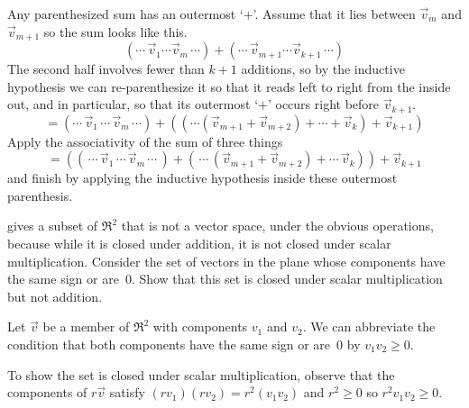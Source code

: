 \begin{exercises}
\begin{answer}
\begin{exparts}
          Any parenthesized sum has an outermost `\( + \)'.
          Assume that it lies between \( \vec{v}_m \) and \( \vec{v}_{m+1} \)
          so the sum looks like this.
          \begin{equation*}
            (\cdots\,\vec{v}_1\cdots\vec{v}_m\,\cdots)
           +(\cdots\,\vec{v}_{m+1}\cdots\vec{v}_{k+1}\,\cdots)
          \end{equation*}
          The second half involves fewer than $k+1$ additions, so
          by the inductive hypothesis we can re-parenthesize it
          so that it reads left to right from the inside out, and in 
          particular, so that its outermost `$+$' occurs right before 
          $\vec{v}_{k+1}$.
          \begin{equation*}
            =(\cdots\,\vec{v}_1\,\cdots\,\vec{v}_m\,\cdots)
             +((\cdots(\vec{v}_{m+1}+\vec{v}_{m+2})+\cdots+\vec{v}_{k})
                 +\vec{v}_{k+1})
          \end{equation*}
          Apply the associativity of the sum of three things
          \begin{equation*}
            =((\,\cdots\, \vec{v}_1\,\cdots\,\vec{v}_m\,\cdots\,)
             +(\,\cdots\,(\vec{v}_{m+1}+\vec{v}_{m+2})+\cdots\,\vec{v}_k))
             +\vec{v}_{k+1}
          \end{equation*}
          and finish by applying the inductive hypothesis inside these 
          outermost parenthesis.
      \end{exparts}  
    \end{answer}
  \item {} gives a subset of $\Re^2$
   that is not a vector space, under the obvious operations, because
   while it is closed under addition, it is not closed under scalar
   multiplication.
   Consider the set of vectors in the plane whose components have the 
   same sign or are~$0$.
   Show that this set is closed under scalar multiplication but not 
   addition.
   \begin{answer}
     Let $\vec{v}$ be a member of $\Re^2$ with components $v_1$ and $v_2$.
     We can abbreviate the condition that both components have the same
     sign or are~$0$ by $v_1v_2\geq 0$.

     To show the set is closed under scalar multiplication, observe that
     the components of $r\vec{v}$ satisfy $(rv_1)(rv_2)=r^2(v_1v_2)$
     and $r^2\geq 0$ so $r^2v_1v_2\geq 0$.


\end{answer}
\end{exercises}
